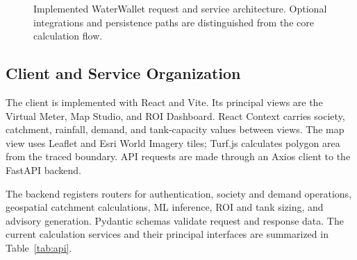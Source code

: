\documentclass[conference]{IEEEtran}
\begin{document}
\begin{figure}[t]
\centering
{}
\caption{Implemented WaterWallet request and service architecture.
Optional integrations and persistence paths are distinguished from the
core calculation flow.}
\label{fig:architecture}
\end{figure}

\subsection{Client and Service Organization}

The client is implemented with React and Vite. Its principal views are
the Virtual Meter, Map Studio, and ROI Dashboard. React Context carries
society, catchment, rainfall, demand, and tank-capacity values between
views. The map view uses Leaflet and Esri World Imagery tiles; Turf.js
calculates polygon area from the traced boundary. API requests are made
through an Axios client to the FastAPI backend.

The backend registers routers for authentication, society and demand
operations, geospatial catchment calculations, ML inference, ROI and tank
sizing, and advisory generation. Pydantic schemas validate request and
response data. The current calculation services and their principal
interfaces are summarized in Table~\ref{tab:api}.
\end{document}
